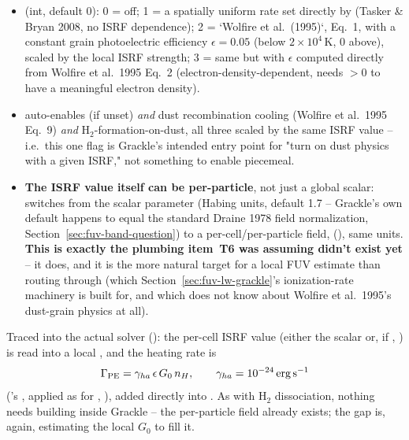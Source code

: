 \begin{itemize}
  \item {} (int, default 0): 0 = off; 1 = a
    spatially uniform rate set directly by
     (Tasker \& Bryan 2008, no ISRF
    dependence); 2 = `Wolfire et al.\ (1995)`, Eq.~1, with a constant
    grain photoelectric efficiency $\epsilon=0.05$ (below $2\times10^4\,$K,
    0 above), scaled by the local ISRF strength; 3 = same but with
    $\epsilon$ computed directly from Wolfire et al.\ 1995 Eq.~2
    (electron-density-dependent, needs $>0$
    to have a meaningful electron density).
  \item {} auto-enables
     (if unset) \emph{and} dust
    recombination cooling (Wolfire et al.\ 1995 Eq.~9) \emph{and}
    H$_2$-formation-on-dust, all three scaled by the same ISRF value --
    i.e.\ this one flag is Grackle's intended entry point for "turn on
    dust physics with a given ISRF," not something to enable piecemeal.
  \item \textbf{The ISRF value itself can be per-particle}, not just a
    global scalar:  switches from the scalar
     parameter (Habing units,
    default 1.7 -- Grackle's own default happens to equal the standard
    Draine 1978 field normalization, Section~\ref{sec:fuv-band-question})
    to a per-cell/per-particle field, 
    (), same units. \textbf{This is exactly
    the plumbing item~T6 was assuming didn't exist yet} -- it does, and
    it is the more natural target for a local FUV estimate than routing
    through  (which Section~\ref{sec:fuv-lw-grackle}'s
    ionization-rate machinery is built for, and which does not know
    about Wolfire et al.\ 1995's dust-grain physics at all).
\end{itemize}
Traced into the actual solver (): the
per-cell ISRF value (either the scalar or, if
, ) is read into a
local , and the heating rate is
\begin{equation}
  \Gamma_{\rm PE} = \gamma_{ha}\,\epsilon\,G_0\,n_H, \qquad
  \gamma_{ha} = 10^{-24}\,{\rm erg\,s^{-1}}
  \label{eq:fuv-pe-heating}
\end{equation}
('s , applied as
 for
, ), added
directly into . As with H$_2$ dissociation, nothing needs
building inside Grackle -- the per-particle  field
already exists; the gap is, again, estimating the local $G_0$ to fill
it.

